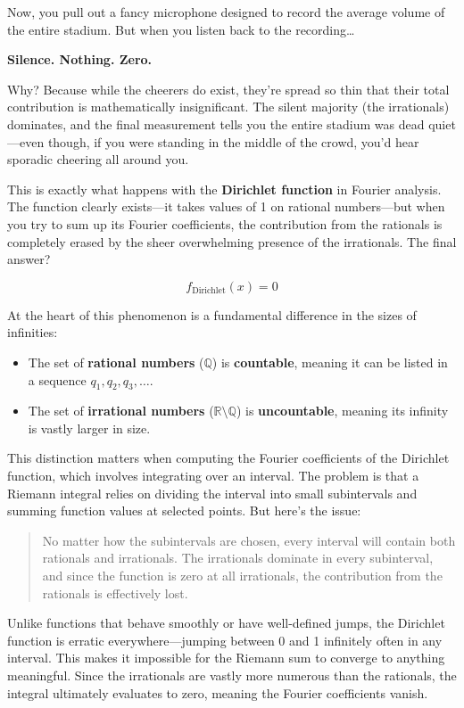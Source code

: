 Now, you pull out a fancy microphone designed to record the average volume of the entire stadium. But when you listen back to the recording…  

\textbf{Silence. Nothing. Zero.}  

Why? Because while the cheerers do exist, they’re spread so thin that their total contribution is mathematically insignificant. The silent majority (the irrationals) dominates, and the final measurement tells you the entire stadium was dead quiet—even though, if you were standing in the middle of the crowd, you’d hear sporadic cheering all around you.  

This is exactly what happens with the \textbf{Dirichlet function} in Fourier analysis. The function clearly exists—it takes values of 1 on rational numbers—but when you try to sum up its Fourier coefficients, the contribution from the rationals is completely erased by the sheer overwhelming presence of the irrationals. The final answer?  

\[
f_{\text{Dirichlet}}(x) = 0
\]

At the heart of this phenomenon is a fundamental difference in the sizes of infinities:

\begin{itemize}
    \item The set of \textbf{rational numbers} (\(\mathbb{Q}\)) is \textbf{countable}, meaning it can be listed in a sequence \( q_1, q_2, q_3, \dots \).
    \item The set of \textbf{irrational numbers} (\(\mathbb{R} \setminus \mathbb{Q}\)) is \textbf{uncountable}, meaning its infinity is vastly larger in size.
\end{itemize}

This distinction matters when computing the Fourier coefficients of the Dirichlet function, which involves integrating over an interval. The problem is that a Riemann integral relies on dividing the interval into small subintervals and summing function values at selected points. But here’s the issue:

\begin{quote}
No matter how the subintervals are chosen, every interval will contain both rationals and irrationals. The irrationals dominate in every subinterval, and since the function is zero at all irrationals, the contribution from the rationals is effectively lost.
\end{quote}

Unlike functions that behave smoothly or have well-defined jumps, the Dirichlet function is erratic everywhere—jumping between 0 and 1 infinitely often in any interval. This makes it impossible for the Riemann sum to converge to anything meaningful. Since the irrationals are vastly more numerous than the rationals, the integral ultimately evaluates to zero, meaning the Fourier coefficients vanish.

